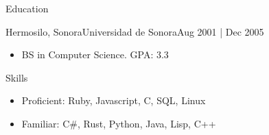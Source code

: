 \documentclass[]{mcdowellcv}
\begin{document}
\begin{cvsection}{Education}
	\begin{cvsubsection}{Hermosilo, Sonora}{Universidad de Sonora}{Aug 2001 | Dec 2005}
		\begin{itemize}
			\item BS in Computer Science. GPA: 3.3
		\end{itemize}
	\end{cvsubsection}
\end{cvsection}
\begin{cvsection}{Skills}
	\begin{cvsubsection}{}{}{}
		\begin{itemize}
			\item Proficient:  Ruby, Javascript, C, SQL, Linux
			\item Familiar:  C\#, Rust, Python, Java, Lisp, C++
		\end{itemize}
	\end{cvsubsection}
\end{cvsection}

\
\end{document}
